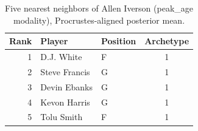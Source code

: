 \begin{table}[htbp]
  \centering\small
  \begin{tabular}{rllc}
    \toprule
    Rank & Player & Position & Archetype \\
    \midrule
    1 & D.J. White & F & 1 \\
    2 & Steve Francis & G & 1 \\
    3 & Devin Ebanks & G & 1 \\
    4 & Kevon Harris & G & 1 \\
    5 & Tolu Smith & F & 1 \\
    \bottomrule
  \end{tabular}
  \caption{Five nearest neighbors of Allen Iverson (peak_age modality), Procrustes-aligned posterior mean.}
  \label{tab:Allen_Iverson_neighbors_peak_age}
\end{table}

